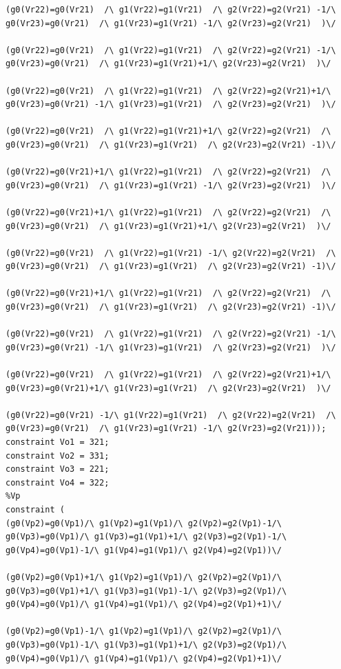 \begin{appendices}
\begin{lstlisting}
(g0(Vr22)=g0(Vr21)  /\ g1(Vr22)=g1(Vr21)  /\ g2(Vr22)=g2(Vr21) -1/\ g0(Vr23)=g0(Vr21)  /\ g1(Vr23)=g1(Vr21) -1/\ g2(Vr23)=g2(Vr21)  )\/ 

(g0(Vr22)=g0(Vr21)  /\ g1(Vr22)=g1(Vr21)  /\ g2(Vr22)=g2(Vr21) -1/\ g0(Vr23)=g0(Vr21)  /\ g1(Vr23)=g1(Vr21)+1/\ g2(Vr23)=g2(Vr21)  )\/ 

(g0(Vr22)=g0(Vr21)  /\ g1(Vr22)=g1(Vr21)  /\ g2(Vr22)=g2(Vr21)+1/\ g0(Vr23)=g0(Vr21) -1/\ g1(Vr23)=g1(Vr21)  /\ g2(Vr23)=g2(Vr21)  )\/ 

(g0(Vr22)=g0(Vr21)  /\ g1(Vr22)=g1(Vr21)+1/\ g2(Vr22)=g2(Vr21)  /\ g0(Vr23)=g0(Vr21)  /\ g1(Vr23)=g1(Vr21)  /\ g2(Vr23)=g2(Vr21) -1)\/ 

(g0(Vr22)=g0(Vr21)+1/\ g1(Vr22)=g1(Vr21)  /\ g2(Vr22)=g2(Vr21)  /\ g0(Vr23)=g0(Vr21)  /\ g1(Vr23)=g1(Vr21) -1/\ g2(Vr23)=g2(Vr21)  )\/ 

(g0(Vr22)=g0(Vr21)+1/\ g1(Vr22)=g1(Vr21)  /\ g2(Vr22)=g2(Vr21)  /\ g0(Vr23)=g0(Vr21)  /\ g1(Vr23)=g1(Vr21)+1/\ g2(Vr23)=g2(Vr21)  )\/ 

(g0(Vr22)=g0(Vr21)  /\ g1(Vr22)=g1(Vr21) -1/\ g2(Vr22)=g2(Vr21)  /\ g0(Vr23)=g0(Vr21)  /\ g1(Vr23)=g1(Vr21)  /\ g2(Vr23)=g2(Vr21) -1)\/ 

(g0(Vr22)=g0(Vr21)+1/\ g1(Vr22)=g1(Vr21)  /\ g2(Vr22)=g2(Vr21)  /\ g0(Vr23)=g0(Vr21)  /\ g1(Vr23)=g1(Vr21)  /\ g2(Vr23)=g2(Vr21) -1)\/ 

(g0(Vr22)=g0(Vr21)  /\ g1(Vr22)=g1(Vr21)  /\ g2(Vr22)=g2(Vr21) -1/\ g0(Vr23)=g0(Vr21) -1/\ g1(Vr23)=g1(Vr21)  /\ g2(Vr23)=g2(Vr21)  )\/ 

(g0(Vr22)=g0(Vr21)  /\ g1(Vr22)=g1(Vr21)  /\ g2(Vr22)=g2(Vr21)+1/\ g0(Vr23)=g0(Vr21)+1/\ g1(Vr23)=g1(Vr21)  /\ g2(Vr23)=g2(Vr21)  )\/ 

(g0(Vr22)=g0(Vr21) -1/\ g1(Vr22)=g1(Vr21)  /\ g2(Vr22)=g2(Vr21)  /\ g0(Vr23)=g0(Vr21)  /\ g1(Vr23)=g1(Vr21) -1/\ g2(Vr23)=g2(Vr21)));
constraint Vo1 = 321;
constraint Vo2 = 331;
constraint Vo3 = 221;
constraint Vo4 = 322;
%Vp
constraint (
(g0(Vp2)=g0(Vp1)/\ g1(Vp2)=g1(Vp1)/\ g2(Vp2)=g2(Vp1)-1/\ g0(Vp3)=g0(Vp1)/\ g1(Vp3)=g1(Vp1)+1/\ g2(Vp3)=g2(Vp1)-1/\ g0(Vp4)=g0(Vp1)-1/\ g1(Vp4)=g1(Vp1)/\ g2(Vp4)=g2(Vp1))\/ 

(g0(Vp2)=g0(Vp1)+1/\ g1(Vp2)=g1(Vp1)/\ g2(Vp2)=g2(Vp1)/\ g0(Vp3)=g0(Vp1)+1/\ g1(Vp3)=g1(Vp1)-1/\ g2(Vp3)=g2(Vp1)/\ g0(Vp4)=g0(Vp1)/\ g1(Vp4)=g1(Vp1)/\ g2(Vp4)=g2(Vp1)+1)\/ 

(g0(Vp2)=g0(Vp1)-1/\ g1(Vp2)=g1(Vp1)/\ g2(Vp2)=g2(Vp1)/\ g0(Vp3)=g0(Vp1)-1/\ g1(Vp3)=g1(Vp1)+1/\ g2(Vp3)=g2(Vp1)/\ g0(Vp4)=g0(Vp1)/\ g1(Vp4)=g1(Vp1)/\ g2(Vp4)=g2(Vp1)+1)\/ 


\end{lstlisting}
\end{appendices}

